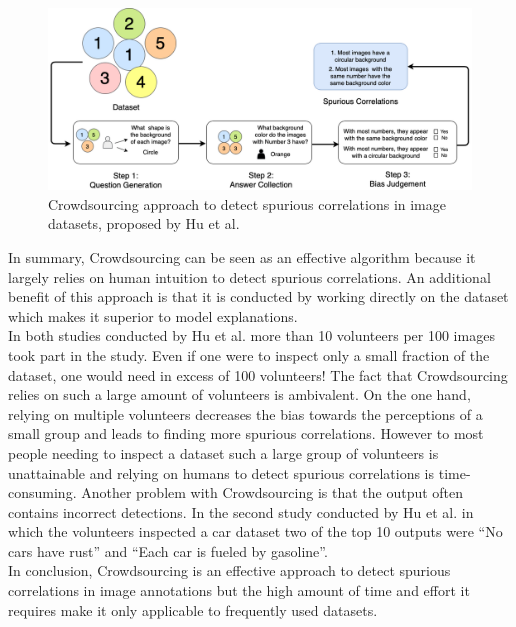 \documentclass{article}
\begin{document}
\begin{figure}
    \centering
    \includegraphics[scale=0.315]{crowdsourcing.png}
    \caption{Crowdsourcing approach to detect spurious correlations in image datasets, proposed by Hu et al. \cite{10.1145/3366423.3380063}}
    \label{fig:crowdsourcing}
\end{figure}

In summary, Crowdsourcing can be seen as an effective algorithm because it largely relies on human intuition to detect spurious correlations. An additional benefit of this approach is that it is conducted by working directly on the dataset which makes it superior to model explanations. \\
In both studies conducted by Hu et al. more than 10 volunteers per 100 images took part in the study. Even if one were to inspect only a small fraction of the dataset, one would need in excess of 100 volunteers! The fact that Crowdsourcing relies on such a large amount of volunteers is ambivalent. On the one hand, relying on multiple volunteers decreases the bias towards the perceptions of a small group and leads to finding more spurious correlations. However to most people needing to inspect a dataset such a large group of volunteers is unattainable and relying on humans to detect spurious correlations is time-consuming. Another problem with Crowdsourcing is that the output often contains incorrect detections. In the second study conducted by Hu et al. in which the volunteers inspected a car dataset two of the top 10 outputs were \enquote{No cars have rust} and \enquote{Each car is fueled by gasoline}. \\
In conclusion, Crowdsourcing is an effective approach to detect spurious correlations in image annotations but the high amount of time and effort it requires make it only applicable to frequently used datasets.
\end{document}
